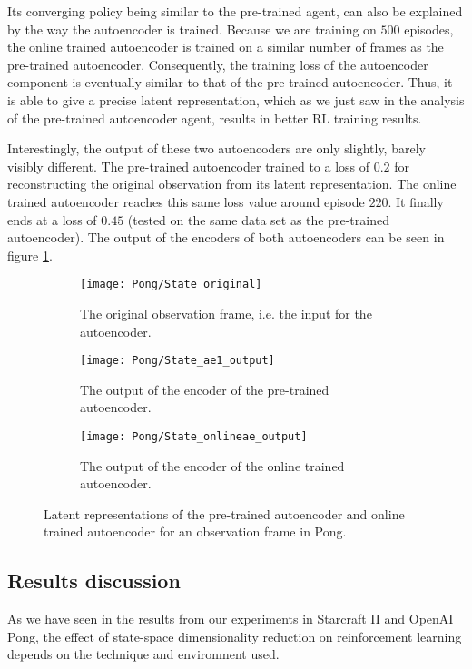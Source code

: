 Its converging policy being similar to the pre-trained agent, can also be explained by the way the autoencoder is trained. Because we are training on $500$ episodes, the online trained autoencoder is trained on a similar number of frames as the pre-trained autoencoder. Consequently, the training loss of the autoencoder component is eventually similar to that of the pre-trained autoencoder. Thus, it is able to give a precise latent representation, which as we just saw in the analysis of the pre-trained autoencoder agent, results in better RL training results.

Interestingly, the output of these two autoencoders are only slightly, barely visibly different. The pre-trained autoencoder trained to a loss of $0.2$ for reconstructing the original observation from its latent representation. The online trained autoencoder reaches this same loss value around episode $220$. It finally ends at a loss of $0.45$ (tested on the same data set as the pre-trained autoencoder). The output of the encoders of both autoencoders can be seen in figure \ref{fig:online-ae-output-pong}.

\begin{figure}[h]
	\centering
	\begin{subfigure}[b]{0.45\textwidth}
		\texttt{[image: Pong/State\_original]}
		\caption{The original observation frame, i.e. the input for the autoencoder.}
	\end{subfigure}\hfill
	\begin{subfigure}[b]{0.45\textwidth}
		\texttt{[image: Pong/State\_ae1\_output]}
		\caption{The output of the encoder of the pre-trained autoencoder.}
	\end{subfigure}\medskip
	\begin{subfigure}[b]{0.45\textwidth}
		\texttt{[image: Pong/State\_onlineae\_output]}
		\caption{The output of the encoder of the online trained autoencoder.}
	\end{subfigure}
	\caption{Latent representations of the pre-trained autoencoder and online trained autoencoder for an observation frame in Pong.}
	\label{fig:online-ae-output-pong}
\end{figure}

\clearpage
\subsection{Results discussion}\label{research-discussion}
As we have seen in the results from our experiments in Starcraft II and OpenAI Pong, the effect of state-space dimensionality reduction on reinforcement learning depends on the technique and environment used. 

